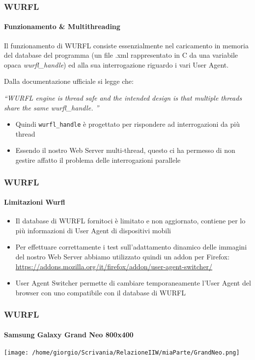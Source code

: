 \documentclass{beamer}
\begin{document}
\begin{frame}
\frametitle{WURFL}
\framesubtitle{Funzionamento \& Multithreading}

Il funzionamento di WURFL consiste essenzialmente nel caricamento in memoria del database del programma (un file .xml rappresentato in C da una variabile opaca \textit{wurfl\_handle}) ed alla sua
interrogazione riguardo i vari User Agent.

\medskip

Dalla documentazione ufficiale si legge che:

\medskip

\textit{ ``WURFL engine is thread safe and the intended design is that multiple
threads share the same wurfl\_handle. ''}

\begin{itemize}
\item Quindi \texttt{wurfl\_handle} è progettato per rispondere ad interrogazioni da più thread
\item Essendo il nostro Web Server multi-thread, questo ci ha permesso di non gestire affatto il problema delle interrogazioni parallele
\end{itemize}


\end{frame}
\begin{frame}

\frametitle{WURFL}
\framesubtitle{Limitazioni Wurfl}

\begin{itemize}

\item Il database di WURFL fornitoci è limitato e non aggiornato, contiene per lo più informazioni di User Agent di dispositivi mobili
\item Per effettuare correttamente i test sull'adattamento dinamico delle immagini del nostro Web Server abbiamo utilizzato quindi un addon per Firefox: \href{https://addons.mozilla.org/it/firefox/addon/user-agent-switcher/}{\color{blue}  https://addons.mozilla.org/it/firefox/addon/user-agent-switcher/}
\item User Agent Switcher permette di cambiare temporaneamente l'User Agent del browser con uno compatibile con il database di WURFL

\end{itemize}



\end{frame}
\begin{frame}
\frametitle{WURFL}
\framesubtitle{Samsung Galaxy Grand Neo 800x400}


\texttt{[image: /home/giorgio/Scrivania/RelazioneIIW/miaParte/GrandNeo.png]}



\end{frame}
\end{document}
